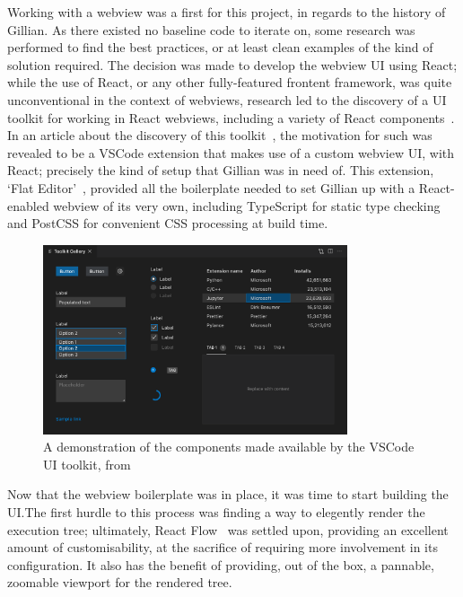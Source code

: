 Working with a webview was a first for this project, in regards to the history
of Gillian. As there existed no baseline code to iterate on, some research was
performed to find the best practices, or at least clean examples of the kind
of solution required. The decision was made to develop the webview UI using
React; while the use of React, or any other fully-featured frontent framework,
was quite unconventional in the context of webviews, research led to the
discovery of a UI toolkit for working in React webviews, including a variety
of React components~\cite{vscode-ui-toolkit}. In an article about the discovery
of this toolkit~\cite{vscode-ui-toolkit-article}, the motivation for such was
revealed to be a VSCode extension that makes use of a custom webview UI, with
React; precisely the kind of setup that Gillian was in need of. This extension,
`Flat Editor'~\cite{flat-editor}, provided all the boilerplate needed to set
Gillian up with a React-enabled webview of its very own, including TypeScript
for static type checking and PostCSS for convenient CSS processing at build
time.

\begin{figure}
  \center{}
  \includegraphics[width=0.8\textwidth]{img/vscode-ui-toolkit-demo.png}
  \caption{
    A demonstration of the components made available by the VSCode UI toolkit,
    from~\cite{vscode-ui-toolkit}}%
  \label{fig:vscode-ui-toolkit-demo}
\end{figure}

Now that the webview boilerplate was in place, it was time to start building the
UI.\@ The first hurdle to this process was finding a way to elegently render
the execution tree; ultimately, React Flow~\cite{react-flow} was settled upon,
providing an excellent amount of customisability, at the sacrifice of requiring
more involvement in its configuration. It also has the benefit of providing,
out of the box, a pannable, zoomable viewport for the rendered tree.


